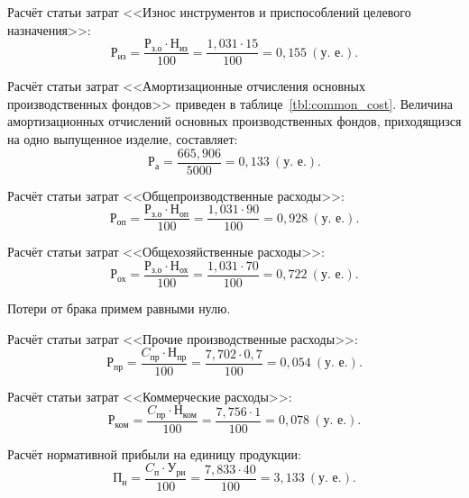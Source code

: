 Расчёт статьи затрат 
<<Износ инструментов и приспособлений целевого назначения>>:
\begin{equation*}
\text{Р}_{\text{из}} = 
\dfrac{
  \text{Р}_{\text{з.о}} \cdot \text{Н}_{\text{из}}
}{
  100
} =
\dfrac{1{,}031 \cdot 15}{100} =
0{,}155 \: (\text{у.~е.}).
\end{equation*}

Расчёт статьи затрат 
<<Амортизационные отчисления основных производственных фондов>> 
приведен в таблице~\ref{tbl:common_cost}.
Величина амортизационных отчислений основных производственных фондов,
приходящизся на одно выпущенное изделие, составляет: 
\begin{equation*}
\text{Р}_{\text{а}} = 
\dfrac{665{,}906}{5000} =
0{,}133 \: (\text{у.~е.}).
\end{equation*}

Расчёт статьи затрат 
<<Общепроизводственные расходы>>:
\begin{equation*}
\text{Р}_{\text{оп}} = 
\dfrac{
  \text{Р}_{\text{з.о}} \cdot \text{Н}_{\text{оп}}
}{
  100
} =
\dfrac{1{,}031 \cdot 90}{100} =
0{,}928 \: (\text{у.~е.}).
\end{equation*}

Расчёт статьи затрат 
<<Общехозяйственные расходы>>:
\begin{equation*}
\text{Р}_{\text{ох}} = 
\dfrac{
  \text{Р}_{\text{з.о}} \cdot \text{Н}_{\text{ох}}
}{
  100
} =
\dfrac{1{,}031 \cdot 70}{100} =
0{,}722 \: (\text{у.~е.}).
\end{equation*}

Потери от брака примем равными нулю.

Расчёт статьи затрат 
<<Прочие производственные расходы>>:
\begin{equation*}
\text{Р}_{\text{пр}} = 
\dfrac{
  C_{\text{пр}} \cdot \text{Н}_{\text{пр}}
}{
  100
} =
\dfrac{7{,}702 \cdot 0{,}7}{100} =
0{,}054 \: (\text{у.~е.}).
\end{equation*}

Расчёт статьи затрат
<<Коммерческие расходы>>:
\begin{equation*}
\text{Р}_{\text{ком}} = 
\dfrac{
  C_{\text{пр}} \cdot \text{Н}_{\text{ком}}
}{
  100
} =
\dfrac{7{,}756 \cdot 1}{100} =
0{,}078 \: (\text{у.~е.}).
\end{equation*}

Расчёт нормативной прибыли на единицу продукции:
\begin{equation*}
\text{П}_{\text{н}} = 
\dfrac{
  C_{\text{п}} \cdot \text{У}_{\text{ри}}
}{
  100
} =
\dfrac{7{,}833 \cdot 40}{100} =
3{,}133 \: (\text{у.~е.}).
\end{equation*}

